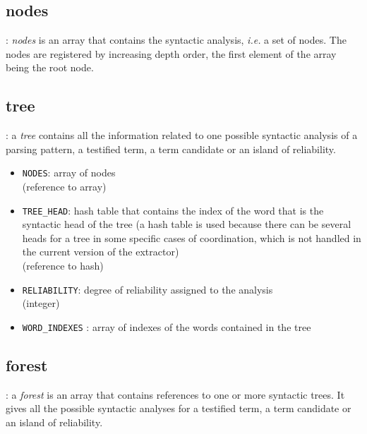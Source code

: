 \subsection{nodes}\label{nodes}
\begin{definition}[nodes]
: \emph{nodes} is an array that contains the syntactic analysis,
\textit{i.e.} a set of  nodes. The nodes are registered by increasing depth order, the first element of the array being the root node.
\end{definition}

\subsection{tree}\label{tree}
\begin{definition}[tree]
: a \emph{tree} contains all the information
related to one possible syntactic analysis of a parsing pattern, a testified
term, a term candidate or an island of reliability. 
\end{definition}

\begin{itemize}
\item \texttt{NODES}: array of nodes \\ (reference to array)
\item \texttt{TREE\_HEAD}: hash table that
  contains the index of the word that is the syntactic head of the
  tree (a hash table is used because there can be several heads for a tree in some specific cases
  of coordination, which is not handled in the current version of the
  extractor)
\\ (reference to hash)
\item \texttt{RELIABILITY}: degree of reliability assigned
  to the analysis\\ (integer)
\item \texttt{WORD\_INDEXES} : array of indexes of the words contained in the tree
\end{itemize}


\subsection{forest }\label{forest}

\begin{definition}[forest]
: a \emph{forest} is an array that contains
references to one or more syntactic trees. It gives all the possible
syntactic analyses for a testified term, a term candidate or an island
of reliability.  
\end{definition}

